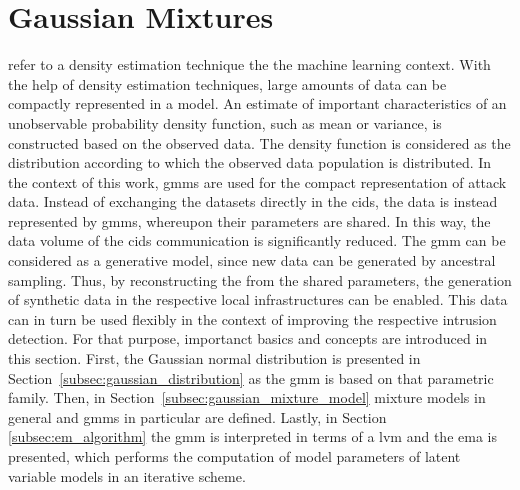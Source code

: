 \documentclass[../../../main.tex]{subfiles}
\begin{document}
\section{Gaussian Mixtures}\label{sec:gaussian_mixtures}

 refer to a density estimation technique the the machine learning context. With the help of density estimation techniques, large amounts of data can be compactly represented in a model. An estimate of important characteristics of an unobservable probability density function, such as mean or variance, is constructed based on the observed data. The density function is considered as the distribution according to which the observed data population is distributed. In the context of this work, \glspl{gmm} are used for the compact representation of attack data. Instead of exchanging the datasets directly in the \gls{cids}, the data is instead represented by gmms, whereupon their parameters are shared. In this way, the data volume of the \gls{cids} communication is significantly reduced. The \gls{gmm} can be considered as a generative model, since new data can be generated by ancestral sampling. Thus, by reconstructing the  from the shared parameters, the generation of synthetic data in the respective local infrastructures can be enabled. This data can in turn be used flexibly in the context of improving the respective intrusion detection. For that purpose, importanct basics and concepts are introduced in this section. First, the Gaussian normal distribution is presented in Section~\ref{subsec:gaussian_distribution} as the \gls{gmm} is based on that parametric family. Then, in Section~\ref{subsec:gaussian_mixture_model} mixture models in general and \glspl{gmm} in particular are defined. Lastly, in Section \ref{subsec:em_algorithm} the \acrshort{gmm} is interpreted in terms of a \gls{lvm} and the \gls{ema} is presented, which performs the computation of model parameters of latent variable models in an iterative scheme.






\end{document}
